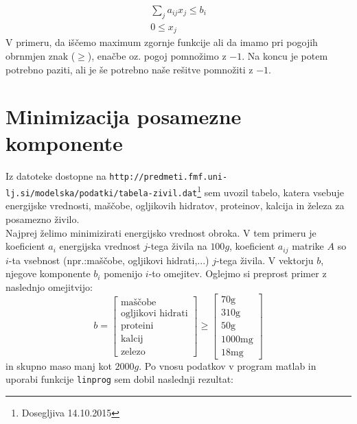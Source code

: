 \documentclass[slovene,11pt,a4paper]{article}
\numberwithin{equation}{section} %
\numberwithin{figure}{section} %
\numberwithin{table}{section} %
\begin{document}
\begin{equation*}
\begin{aligned}
\sum_j a_{ij} x_j \leq b_i\\
0 \leq x_j
\end{aligned}
\end{equation*}
V primeru, da iščemo maximum zgornje funkcije ali da imamo pri pogojih obrnmjen znak ($\geq $), enačbe oz. pogoj pomnožimo z $-1$. Na koncu je potem potrebno paziti, ali je še potrebno naše rešitve pomnožiti z $-1$.


\section{Minimizacija posamezne komponente}
Iz datoteke dostopne na {\tt http://predmeti.fmf.uni-lj.si/modelska/podatki/tabela-zivil.dat}\footnote{Dosegljiva 14.10.2015} sem uvozil tabelo, katera vsebuje energijske vrednosti, maščobe, ogljikovih hidratov, proteinov, kalcija in železa za posamezno živilo.
\\
 Najprej želimo minimizirati energijsko vrednost obroka. V tem primeru je koeficient $a_i$ energijska vrednost $j$-tega živila na $100g$, koeficient $a_{ij}$ matrike $A$ so $i$-ta vsebnost (npr.:maščobe, ogljikovi hidrati,...) $j$-tega živila. V vektorju $b$, njegove komponente $b_i$ pomenijo $i$-to omejitev. Oglejmo si preprost primer z naslednjo omejitvijo:
\begin{equation}
\label{eq-pogoj-prva}
    b =
    \begin{bmatrix}
        \text{maščobe} \\
        \text{ogljikovi hidrati} \\
        \text{proteini} \\
        \text{kalcij} \\
        \text{zelezo}
    \end{bmatrix}
    \geq
        \begin{bmatrix}
        \text{70g} \\
        \text{310g} \\
        \text{50g} \\
        \text{1000mg} \\
        \text{18mg}
    \end{bmatrix}
\end{equation}
in skupno maso manj kot $2000g$. Po vnosu podatkov v program matlab in uporabi funkcije {\tt linprog} sem dobil naslednji rezultat:
\end{document}
